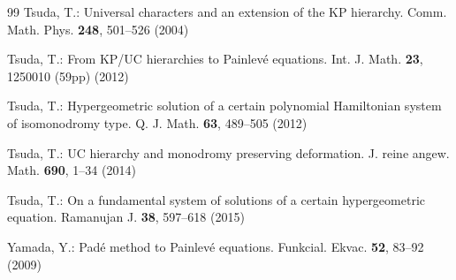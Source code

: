 \documentclass[12pt]{article}
\numberwithin{equation}{section}
\begin{document}
\begin{thebibliography}{99}
Tsuda, T.:
Universal characters and an extension of the KP hierarchy.
Comm. Math. Phys. 
{\bf 248}, 501--526 (2004)

Tsuda, T.:
From KP/UC hierarchies to Painlev\'e equations.
Int. J. Math. 
{\bf 23}, 1250010 (59pp) (2012) 


Tsuda, T.:
Hypergeometric solution of a certain polynomial Hamiltonian system of isomonodromy type.
Q. J. Math. {\bf 63},
489--505 (2012)


Tsuda, T.:
UC hierarchy and monodromy preserving deformation.
J. reine angew. Math.  {\bf 690},
 1--34 (2014)


Tsuda, T.:
On a fundamental system of solutions of a certain hypergeometric equation.
Ramanujan J. {\bf 38},
597--618 (2015) 


Yamada,  Y.:
Pad\'e method to Painlev\'e equations.
Funkcial. Ekvac. 
{\bf 52},
83--92 (2009)
 
\end{thebibliography}
\end{document}

